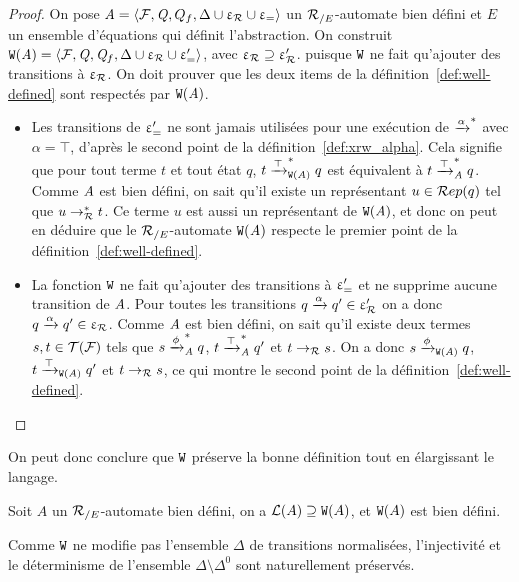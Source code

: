 \begin{proof}
  On pose $\mathit A = \langle \mathcal{F}, \mathit Q, Q_f, \Delta \cup \upvarepsilon_{\mathcal R} \cup \upvarepsilon_{=}\rangle$ un ${\mathcal R_{/E}}$-automate bien défini et
  $E$ un ensemble d'équations qui définit l'abstraction.
  On construit $\mathtt{W}(\mathit A) = \langle \mathcal{F}, \mathit Q, \mathit Q_f, \Delta \cup \upvarepsilon_{\mathcal R} \cup \upvarepsilon_{=}'\rangle$, avec $\upvarepsilon_{\mathcal R} \supseteq \upvarepsilon_{\mathcal R}'$.
  puisque $\mathtt{W}$ ne fait qu'ajouter des transitions à $\upvarepsilon_{\mathcal R}$. On doit prouver que les deux items de la définition~\ref{def:well-defined}
  sont respectés par $\mathtt{W}(\mathit A)$.
  \begin{itemize}
  \item 
    Les transitions de $\upvarepsilon_{=}'$ ne sont jamais utilisées pour une exécution de $\xrightarrow{\alpha}^*$ avec $\alpha = \top$,
    d'après le second point de la définition~\ref{def:xrw_alpha}.
    Cela signifie que pour tout terme $t$ et tout état $q$, $t \xrightarrow{\top}_{\mathtt{W}(\mathit A)}^* q$ est équivalent à $t \xrightarrow{\top}^*_\mathit A q$.
    Comme $\mathit A$ est bien défini, on sait qu'il existe un représentant $u \in \mathcal R ep(q)$ tel que $u \rightarrow^*_\mathcal R t$.
    Ce terme $u$ est aussi un représentant de $\mathtt{W}(\mathit A)$, et donc on peut en déduire que le ${\mathcal R_{/E}}$-automate $\mathtt{W}(\mathit A)$ 
    respecte le premier point de la définition~\ref{def:well-defined}.

  \item
    La fonction $\mathtt{W}$ ne fait qu'ajouter des transitions à $\upvarepsilon_{=}'$ et ne supprime aucune transition de $\mathit A$.
    Pour toutes les transitions $q \xrightarrow{\alpha} q' \in \upvarepsilon_{\mathcal R}'$ on a donc $q \xrightarrow{\alpha} q' \in \upvarepsilon_{\mathcal R}$.
    Comme $\mathit A$ est bien défini, on sait qu'il existe deux termes $s,t\in \mathcal{T(F)}$ tels que
    $s\xrightarrow{\phi}^*_\mathit A q$, $t\xrightarrow{\top}^*_\mathit A q'$ et $t \rightarrow_\mathcal R s$.
    On a donc $s\xrightarrow{\phi}_{\mathtt{W}(\mathit A)} q$, $t\xrightarrow{\top}_{\mathtt{W}(\mathit A)} q'$ et $t \rightarrow_\mathcal R s$, ce qui montre le second point
    de la définition~\ref{def:well-defined}.
  \end{itemize}
\end{proof}

On peut donc conclure que $\mathtt{W}$ préserve la bonne définition tout en élargissant le langage.

\begin{property}
  \label{thm:W}
  Soit $A$ un ${\mathcal R_{/E}}$-automate bien défini, on a $\mathcal{L}(A) \supseteq \mathtt{W}(A)$,
  et $\mathtt{W}(A)$ est bien défini.
\end{property}


\begin{remark}
  Comme $\mathtt{W}$ ne modifie pas l'ensemble $\Delta$ de transitions normalisées,   
  l'injectivité et le déterminisme de l'ensemble $\Delta \setminus \Delta^0$ sont naturellement
  préservés. 
\end{remark}

